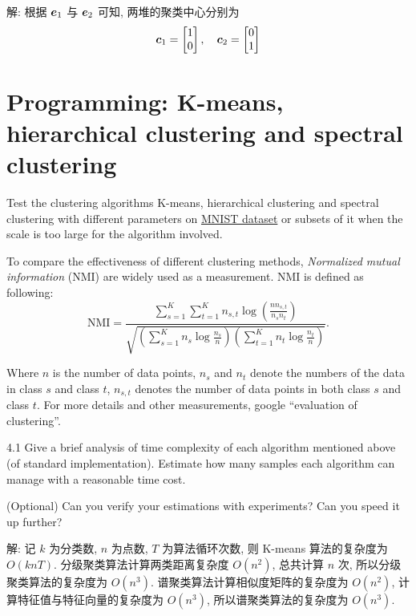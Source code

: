 \documentclass{article}
\begin{document}
解: 根据 $\bm{e}_1$ 与 $\bm{e}_2$ 可知, 两堆的聚类中心分别为
\begin{equation}
  \bm{c}_1=\begin{bmatrix}
    1\\0
  \end{bmatrix},\quad
  \bm{c}_2=\begin{bmatrix}
    0\\1
  \end{bmatrix}
\end{equation}

\section*{Programming: K-means, hierarchical clustering and spectral clustering}

Test the clustering algorithms K-means, hierarchical clustering and spectral clustering with different parameters on \href{http://yann.lecun.com/exdb/mnist/}{MNIST dataset} or subsets of it when the scale is too large for the algorithm involved.

To compare the effectiveness of different clustering methods, \emph{Normalized mutual information} (NMI) are widely used as a measurement. NMI is defined as following:
\begin{equation}
  \text{NMI} = \frac{\displaystyle\sum_{s=1}^{K}\sum_{t=1}^{K}n_{s,t}\log\left(\frac{nn_{s,t}}{n_{s}n_{t}}\right)}{\displaystyle\sqrt{\left(\sum_{s=1}^Kn_{s}\log\frac{n_{s}}{n}\right)\left(\sum_{t=1}^Kn_{t}\log\frac{n_{t}}{n}\right)}}.
\end{equation}

Where $n$ is the number of data points, $n_{s}$ and $n_{t}$ denote the numbers of the data in class $s$ and class $t$, $n_{s,t}$ denotes the number of data points in both class $s$ and class $t$. For more details and other measurements, google ``evaluation of clustering''.

4.1 Give a brief analysis of time complexity of each algorithm mentioned above (of standard implementation). Estimate how many samples each algorithm can manage with a reasonable time cost.

(Optional) Can you verify your estimations with experiments? Can you speed it up further?

解: 记 $k$ 为分类数, $n$ 为点数, $T$ 为算法循环次数, 则 K-means 算法的复杂度为 $O(knT)$. 分级聚类算法计算两类距离复杂度 $O(n^2)$, 总共计算 $n$ 次, 所以分级聚类算法的复杂度为 $O(n^3)$. 谱聚类算法计算相似度矩阵的复杂度为 $O(n^2)$, 计算特征值与特征向量的复杂度为 $O(n^3)$, 所以谱聚类算法的复杂度为 $O(n^3)$.
\end{document}
